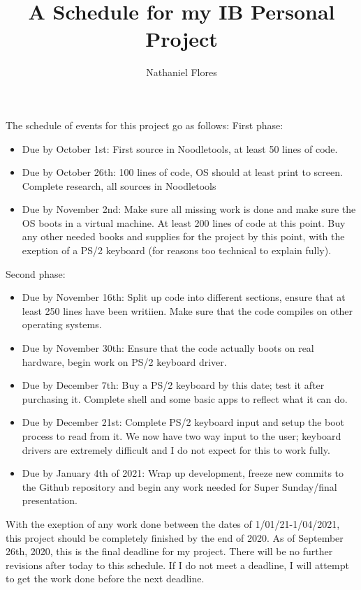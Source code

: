 \documentclass[a4paper,10pt]{article}
\title{A Schedule for my IB Personal Project}
\author{Nathaniel Flores}
\begin{document}
\maketitle
The schedule of events for this project go as follows:
\newline
\newline
First phase:
\begin{itemize}
 \item Due by October 1st: First source in Noodletools, at least 50 lines of code.
 \item Due by October 26th: 100 lines of code, OS should at least print to screen. Complete research, all sources in Noodletools
 \item Due by November 2nd: Make sure all missing work is done and make sure the OS boots in a virtual machine. At least 200 lines of code at this point. Buy any other needed books and supplies for the project by this point, with the exeption of a PS/2 keyboard (for reasons too technical to explain fully).
\end{itemize}
Second phase:
\begin{itemize}
 \item Due by November 16th: Split up code into different sections, ensure that at least 250 lines have been writiien. Make sure that the code compiles on other operating systems.
 \item Due by November 30th: Ensure that the code actually boots on real hardware, begin work on PS/2 keyboard driver.
 \item Due by December 7th: Buy a PS/2 keyboard by this date; test it after purchasing it. Complete shell and some basic apps to reflect what it can do.
 \item Due by December 21st: Complete PS/2 keyboard input and setup the boot process to read from it. We now have two way input to the user; keyboard drivers are extremely difficult and I do not expect for this to work fully.
 \item Due by January 4th of 2021: Wrap up development, freeze new commits to the Github repository and begin any work needed for Super Sunday/final presentation.
\end{itemize}
With the exeption of any work done between the dates of 1/01/21-1/04/2021, this project should be completely finished by the end of 2020. As of September 26th, 2020, this is the final deadline for my project. There will be no further revisions after today to this schedule. If I do not meet a deadline, I will attempt to get the work done before the next deadline.
\end{document}
